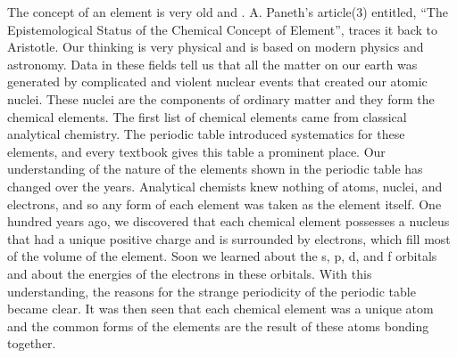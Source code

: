 \documentclass{article}
\newcommand{\CommonElementTextFormat}[4]
{
  \begin{minipage}{2.2cm}
    \centering
      {\textbf{#1} \hfill #2}%
      \linebreak \linebreak
      {\textbf{#3}}%
      \linebreak \linebreak
      {{#4}}
  \end{minipage}
}
\newcommand{\NaturalElementTextFormat}[4]
{
  \CommonElementTextFormat{#1}{#2}{\LARGE {#3}}{#4}
}
\def\centerfigure#1{%
  \setbox\mybox\hbox{#1}%
  \raisebox{-0.43\dimexpr\ht\mybox+\dp\mybox}{\copy\mybox}%
}
\begin{document}
The concept of an element is very old and \scalebox{0.3}{
  \centerfigure{\begin{tikzpicture}[font=\sffamily, transform shape]
    \node[name=F, Nonmetal, rounded corners=.15cm, node distance=3cm] {\hyperlink{subsubsection::F}{\NaturalElementTextFormat{9}{18.998}{F}{Fluorine}}};
  \end{tikzpicture}}
}. A. Paneth’s article(3) entitled, “The Epistemological Status of the Chemical Concept of Element”, traces it back to Aristotle. Our thinking is very physical and is based on modern physics and astronomy. Data in these fields tell us that all the matter on our earth was generated by complicated and violent nuclear events that created our atomic nuclei. These nuclei are the components of ordinary matter and they form the chemical elements. The first list of chemical elements came from classical analytical chemistry. The periodic table introduced systematics for these elements, and every textbook gives this table a prominent place. Our understanding of the nature of the elements shown in the periodic table has changed over the years. Analytical chemists knew nothing of atoms, nuclei, and electrons, and so any form of each element was taken as the element itself. One hundred years ago, we discovered that each chemical element possesses a nucleus that had a unique positive charge and is surrounded by electrons, which fill most of the volume of the element. Soon we learned about the s, p, d, and f orbitals and about the energies of the electrons in these orbitals. With this understanding, the reasons for the strange periodicity of the periodic table became clear. It was then seen that each chemical element was a unique atom and the common forms of the elements are the result of these atoms bonding together.
\end{document}

